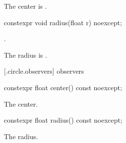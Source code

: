 \begin{itemdescr}
\pnum
\effects
The center is .
\end{itemdescr}

%
\begin{itemdecl}
constexpr void radius(float r) noexcept;
\end{itemdecl}
\begin{itemdescr}
\requires
{}.

\pnum
\effects
The radius is .
\end{itemdescr}

 [\iotwod.circle.observers]{ observers}

%
\begin{itemdecl}
constexpr float center() const noexcept;
\end{itemdecl}
\begin{itemdescr}
\pnum
\returns
The center.
\end{itemdescr}

%
\begin{itemdecl}
constexpr float radius() const noexcept;
\end{itemdecl}
\begin{itemdescr}
\pnum
\returns
The radius.
\end{itemdescr}
